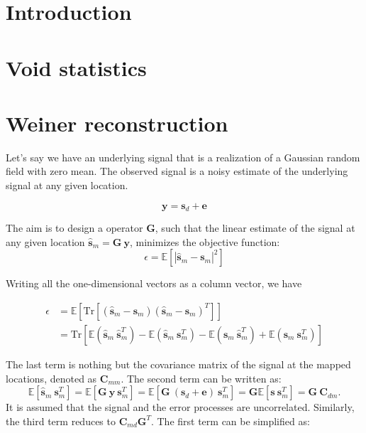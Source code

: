 \documentclass{article}
\begin{document}
\section{Introduction}


\section{Void statistics}

\section{Weiner reconstruction}
Let's say we have an underlying signal that is a realization of a Gaussian random field with zero mean. The observed signal is a noisy estimate of the underlying signal at any given location.

\begin{equation}
\mathbf{y} = \mathbf{s}_d + \mathbf{e}
\end{equation}

The aim is to design a operator $\mathbf{G}$, such that the linear estimate  of the signal at any given location $\mathbf{\hat{s}}_m = \mathbf{G}\ \mathbf{y}$, minimizes the objective function:
\begin{equation}
\epsilon = \mathbb{E}[ |\mathbf{\hat{s}}_m - \mathbf{s}_m|^2]
\end{equation}

Writing all the one-dimensional vectors as a column vector, we have

\begin{align*}
    \epsilon &= \mathbb{E}[\mathrm{Tr}[(\mathbf{\hat{s}}_m - \mathbf{s}_m)(\mathbf{\hat{s}}_m - \mathbf{s}_m)^T]] \\
             &= \mathrm{Tr}[\mathbb{E} (\mathbf{\hat{s}}_m\ \mathbf{\hat{s}}_m^T) - \mathbb{E} (\mathbf{\hat{s}}_m\ \mathbf{s}_m^T) - \mathbb{E} (\mathbf{s}_m\ \mathbf{\hat{s}}_m^T) + \mathbb{E} (\mathbf{s}_m\ \mathbf{s}_m^T)]
\end{align*}

The last term is nothing but the covariance matrix of the signal at the mapped locations, denoted as $\mathbf{C}_{mm}$. The second term can be written as:
\[\mathbb{E} [\mathbf{\hat{s}}_m\ \mathbf{s}_m^T] = \mathbb{E} [\mathbf{G}\ \mathbf{y}\  \mathbf{s}_m^T] = \mathbb{E} [\mathbf{G}\ (\mathbf{s}_d + \mathbf{e})\  \mathbf{s}_m^T]  = \mathbf{G} \mathbb{E} [\mathbf{s}\ \mathbf{s}_m^T] = \mathbf{G}\ \mathbf{C}_{dm}.
\]
It is assumed that the signal and the error processes are uncorrelated. Similarly, the third term reduces to $\mathbf{C}_{md} \mathbf{G}^T$. The first term can be simplified as:
\end{document}
